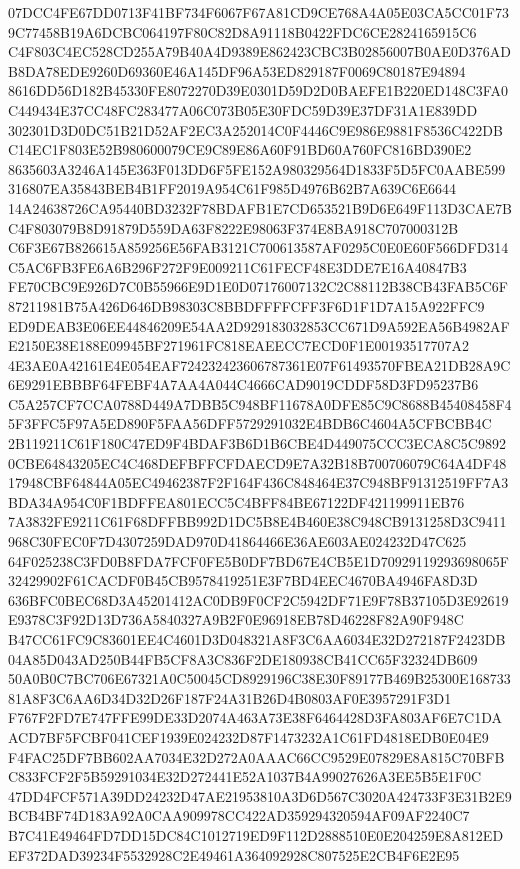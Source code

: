 \documentclass[UTF8,fontset=fandol,zihao=-4,a4paper]{ctexart}
\begin{document}
{{07DCC4FE67DD0713F41BF734F6067F67A81CD9CE768A4A05E03CA5CC01F739C77458B19A6DCBC064197F80C82D8A91118B0422FDC6CE2824165915C6
C4F803C4EC528CD255A79B40A4D9389E862423CBC3B02856007B0AE0D376ADB8DA78EDE9260D69360E46A145DF96A53ED829187F0069C80187E94894
8616DD56D182B45330FE8072270D39E0301D59D2D0BAEFE1B220ED148C3FA0C449434E37CC48FC283477A06C073B05E30FDC59D39E37DF31A1E839DD
302301D3D0DC51B21D52AF2EC3A252014C0F4446C9E986E9881F8536C422DBC14EC1F803E52B980600079CE9C89E86A60F91BD60A760FC816BD390E2
8635603A3246A145E363F013DD6F5FE152A980329564D1833F5D5FC0AABE599316807EA35843BEB4B1FF2019A954C61F985D4976B62B7A639C6E6644
14A24638726CA95440BD3232F78BDAFB1E7CD653521B9D6E649F113D3CAE7BC4F803079B8D91879D559DA63F8222E98063F374E8BA918C707000312B
C6F3E67B826615A859256E56FAB3121C700613587AF0295C0E0E60F566DFD314C5AC6FB3FE6A6B296F272F9E009211C61FECF48E3DDE7E16A40847B3
FE70CBC9E926D7C0B55966E9D1E0D07176007132C2C88112B38CB43FAB5C6F87211981B75A426D646DB98303C8BBDFFFFCFF3F6D1F1D7A15A922FFC9
ED9DEAB3E06EE44846209E54AA2D929183032853CC671D9A592EA56B4982AFE2150E38E188E09945BF271961FC818EAEECC7ECD0F1E00193517707A2
4E3AE0A42161E4E054EAF724232423606787361E07F61493570FBEA21DB28A9C6E9291EBBBF64FEBF4A7AA4A044C4666CAD9019CDDF58D3FD95237B6
C5A257CF7CCA0788D449A7DBB5C948BF11678A0DFE85C9C8688B45408458F45F3FFC5F97A5ED890F5FAA56DFF5729291032E4BDB6C4604A5CFBCBB4C
2B119211C61F180C47ED9F4BDAF3B6D1B6CBE4D449075CCC3ECA8C5C98920CBE64843205EC4C468DEFBFFCFDAECD9E7A32B18B700706079C64A4DF48
17948CBF64844A05EC49462387F2F164F436C848464E37C948BF91312519FF7A3BDA34A954C0F1BDFFEA801ECC5C4BFF84BE67122DF421199911EB76
7A3832FE9211C61F68DFFBB992D1DC5B8E4B460E38C948CB9131258D3C9411968C30FEC0F7D4307259DAD970D41864466E36AE603AE024232D47C625
64F025238C3FD0B8FDA7FCF0FE5B0DF7BD67E4CB5E1D70929119293698065F32429902F61CACDF0B45CB9578419251E3F7BD4EEC4670BA4946FA8D3D
636BFC0BEC68D3A45201412AC0DB9F0CF2C5942DF71E9F78B37105D3E92619E9378C3F92D13D736A5840327A9B2F0E96918EB78D46228F82A90F948C
B47CC61FC9C83601EE4C4601D3D048321A8F3C6AA6034E32D272187F2423DB04A85D043AD250B44FB5CF8A3C836F2DE180938CB41CC65F32324DB609
50A0B0C7BC706E67321A0C50045CD8929196C38E30F89177B469B25300E16873381A8F3C6AA6D34D32D26F187F24A31B26D4B0803AF0E3957291F3D1
F767F2FD7E747FFE99DE33D2074A463A73E38F6464428D3FA803AF6E7C1DAACD7BF5FCBF041CEF1939E024232D87F1473232A1C61FD4818EDB0E04E9
F4FAC25DF7BB602AA7034E32D272A0AAAC66CC9529E07829E8A815C70BFBC833FCF2F5B59291034E32D272441E52A1037B4A99027626A3EE5B5E1F0C
47DD4FCF571A39DD24232D47AE21953810A3D6D567C3020A424733F3E31B2E9BCB4BF74D183A92A0CAA909978CC422AD359294320594AF09AF2240C7
B7C41E49464FD7DD15DC84C1012719ED9F112D2888510E0E204259E8A812EDEF372DAD39234F5532928C2E49461A364092928C807525E2CB4F6E2E95
}}
\end{document}

